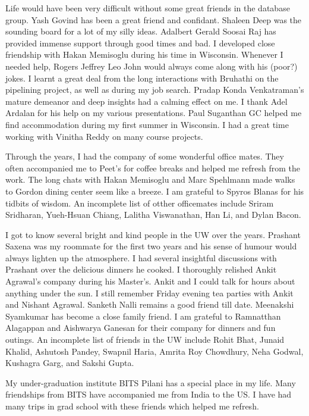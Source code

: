 Life would have been very difficult without some great friends in the database group. 
Yash Govind has been a great friend and confidant.
Shaleen Deep was the sounding board for a lot of my silly ideas.
Adalbert Gerald Soosai Raj has provided immense support through good times and bad. 
I developed close friendship with Hakan Memisoglu during his time in Wisconsin.
Whenever I needed help, Rogers Jeffrey Leo John would always come along with his (poor?) jokes. 
I learnt a great deal from the long interactions with Bruhathi on the pipelining project, as well as during my job search.
Pradap Konda Venkatraman's mature demeanor and deep insights had a calming effect on me.
I thank Adel Ardalan for his help on my various presentations. 
Paul Suganthan GC helped me find accommodation during my first summer in Wisconsin. 
I had a great time working with Vinitha Reddy on many course projects.

Through the years, I had the company of some wonderful office mates. 
They often accompanied me to Peet's for coffee breaks and helped me refresh from the work.
The long chats with Hakan Memisoglu and Marc Spehlmann made walks to Gordon dining center seem like a breeze.
I am grateful to Spyros Blanas for his tidbits of wisdom. 
An incomplete list of otther officemates include Sriram Sridharan, Yueh-Hsuan Chiang, Lalitha Viswanathan, Han Li, and Dylan Bacon.

I got to know several bright and kind people in the UW over the years. 
Prashant Saxena was my roommate for the first two years and his sense of humour would always lighten up the atmosphere. 
I had several insightful discussions with Prashant over the delicious dinners he cooked. 
I thoroughly relished Ankit Agrawal's company during his Master's.
Ankit and I could talk for hours about anything under the sun.
I still remember Friday evening tea parties with Ankit and Nishant Agrawal. 
Sanketh Nalli remains a good friend till date.
Meenakshi Syamkumar has become a close family friend. 
I am grateful to Ramnatthan Alagappan and Aishwarya Ganesan for their company for dinners and fun outings.
An incomplete list of friends in the UW include Rohit Bhat, Junaid Khalid, Ashutosh Pandey, Swapnil Haria, Amrita Roy Chowdhury, Neha Godwal, Kushagra Garg, and Sakshi Gupta. 

My under-graduation institute BITS Pilani has a special place in my life.
Many friendships from BITS have accompanied me from India to the US. 
I have had many trips in grad school with these friends which helped me refresh.


